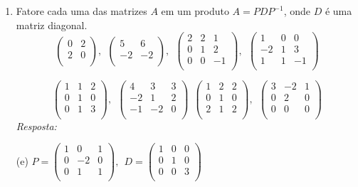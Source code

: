 \documentclass[10pt]{article}
\theoremstyle{plain}
\theoremstyle{obs}
\numberwithin{equation}{section}
\begin{document}
\begin{enumerate}
 \item Fatore cada uma das matrizes $A$ em um produto 
 $A=PDP^{-1}$, onde $D$ é uma matriz diagonal.
    $$
\begin{pmatrix}
0 & 2 \\
2 & 0 \\
\end{pmatrix}, \ \ 
\begin{pmatrix}
5 & 6 \\
-2 & -2 \\
\end{pmatrix}, \ \ 
\begin{pmatrix}
2 & 2 & 1 \\
0 & 1 & 2 \\
0 & 0 & -1 \\
\end{pmatrix}, \ \
\begin{pmatrix}
1 & 0 & 0 \\%
-2 & 1 & 3 \\
1 & 1 & -1 \\
\end{pmatrix} 
$$
 
$$
\begin{pmatrix}
1 & 1 & 2 \\
0 & 1 & 0 \\
0 & 1 & 3 \\
\end{pmatrix}, \ \
\begin{pmatrix}
4 & 3 & 3 \\%
-2 & 1 & 2 \\
-1 & -2 & 0 \\
\end{pmatrix} \ \ 
\begin{pmatrix}
1 & 2 & 2 \\
0 & 1 & 0 \\
2 & 1 & 2 \\
\end{pmatrix}, \ \
\begin{pmatrix}
3 & -2 & 1 \\%
0 & 2 & 0 \\
0 & 0 & 0 \\
\end{pmatrix} 
$$
 {\it Resposta:}
 
 (e) 
 $ P=\begin{pmatrix}
1 & 0 & 1 \\
0 & -2 & 0 \\
0 & 1 & 1 \\
\end{pmatrix}, \ \
D=
\begin{pmatrix}
1 & 0 & 0 \\%
0 & 1 & 0 \\
0 & 0 & 3 \\
\end{pmatrix}
 $
 

\end{enumerate}
\end{document}
